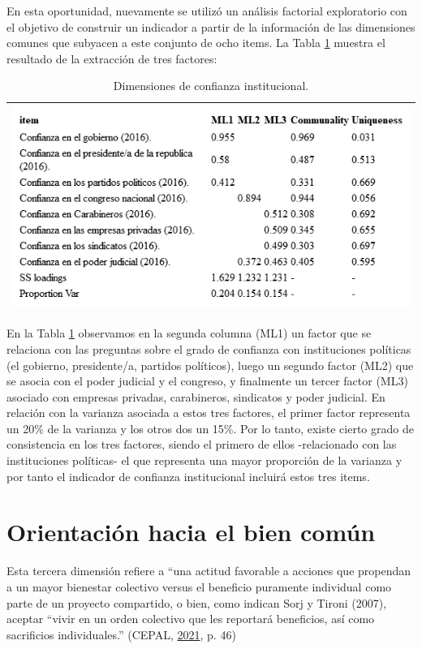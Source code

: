 \documentclass[
  12pt,
]{book}
\begin{document}
En esta oportunidad, nuevamente se utilizó un análisis factorial exploratorio con el objetivo de construir un indicador a partir de la información de las dimensiones comunes que subyacen a este conjunto de ocho items. La Tabla \ref{tab:inst-fa} muestra el resultado de la extracción de tres factores:

\begin{longtable}[]{@{}l@{}}
\caption{\label{tab:inst-fa}Dimensiones de confianza institucional.}\tabularnewline
\toprule
\endhead
\includegraphics[width=6.77083in,height=\textheight]{output/tables/inst_fa.png}\tabularnewline
\bottomrule
\end{longtable}

En la Tabla \ref{tab:inst-fa} observamos en la segunda columna (ML1) un factor que se relaciona con las preguntas sobre el grado de confianza con instituciones políticas (el gobierno, presidente/a, partidos políticos), luego un segundo factor (ML2) que se asocia con el poder judicial y el congreso, y finalmente un tercer factor (ML3) asociado con empresas privadas, carabineros, sindicatos y poder judicial. En relación con la varianza asociada a estos tres factores, el primer factor representa un 20\% de la varianza y los otros dos un 15\%. Por lo tanto, existe cierto grado de consistencia en los tres factores, siendo el primero de ellos -relacionado con las instituciones políticas- el que representa una mayor proporción de la varianza y por tanto el indicador de confianza institucional incluirá estos tres items.

\hypertarget{orientaciuxf3n-hacia-el-bien-comuxfan}{%
\section{Orientación hacia el bien común}\label{orientaciuxf3n-hacia-el-bien-comuxfan}}

Esta tercera dimensión refiere a ``una actitud favorable a acciones que propendan a un mayor bienestar colectivo versus el beneficio puramente individual como parte de un proyecto compartido, o bien, como indican Sorj y Tironi (2007), aceptar ``vivir en un orden colectivo que les reportará beneficios, así como sacrificios individuales.'' (CEPAL, \protect\hyperlink{ref-cepal_cohesion_2021}{2021}, p. 46)
\end{document}
